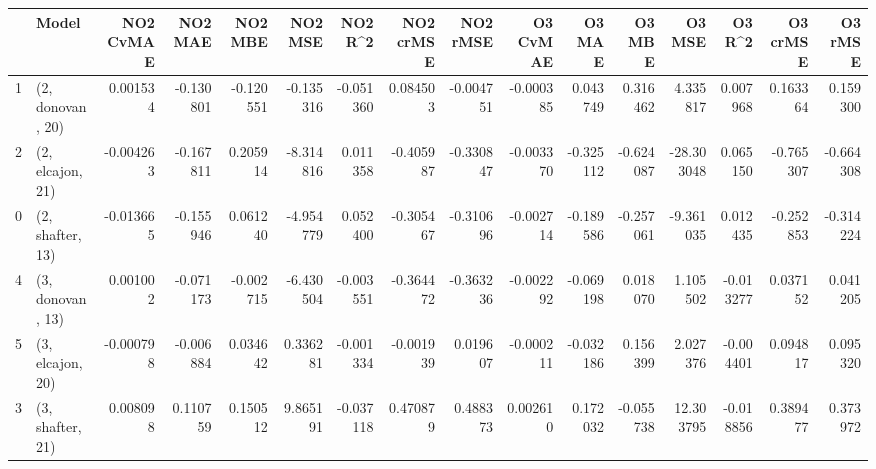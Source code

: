 \begin{tabular}{llrrrrrrrrrrrrrr}
\toprule
{} &             Model &  NO2 CvMAE &   NO2 MAE &   NO2 MBE &   NO2 MSE &   NO2 R\textasciicircum2 &  NO2 crMSE &  NO2 rMSE &  O3 CvMAE &    O3 MAE &    O3 MBE &     O3 MSE &    O3 R\textasciicircum2 &  O3 crMSE &   O3 rMSE \\
\midrule
1 &  (2, donovan, 20) &   0.001534 & -0.130801 & -0.120551 & -0.135316 & -0.051360 &   0.084503 & -0.004751 & -0.000385 &  0.043749 &  0.316462 &   4.335817 &  0.007968 &  0.163364 &  0.159300 \\
2 &  (2, elcajon, 21) &  -0.004263 & -0.167811 &  0.205914 & -8.314816 &  0.011358 &  -0.405987 & -0.330847 & -0.003370 & -0.325112 & -0.624087 & -28.303048 &  0.065150 & -0.765307 & -0.664308 \\
0 &  (2, shafter, 13) &  -0.013665 & -0.155946 &  0.061240 & -4.954779 &  0.052400 &  -0.305467 & -0.310696 & -0.002714 & -0.189586 & -0.257061 &  -9.361035 &  0.012435 & -0.252853 & -0.314224 \\
4 &  (3, donovan, 13) &   0.001002 & -0.071173 & -0.002715 & -6.430504 & -0.003551 &  -0.364472 & -0.363236 & -0.002292 & -0.069198 &  0.018070 &   1.105502 & -0.013277 &  0.037152 &  0.041205 \\
5 &  (3, elcajon, 20) &  -0.000798 & -0.006884 &  0.034642 &  0.336281 & -0.001334 &  -0.001939 &  0.019607 & -0.000211 & -0.032186 &  0.156399 &   2.027376 & -0.004401 &  0.094817 &  0.095320 \\
3 &  (3, shafter, 21) &   0.008098 &  0.110759 &  0.150512 &  9.865191 & -0.037118 &   0.470879 &  0.488373 &  0.002610 &  0.172032 & -0.055738 &  12.303795 & -0.018856 &  0.389477 &  0.373972 \\
\bottomrule
\end{tabular}
